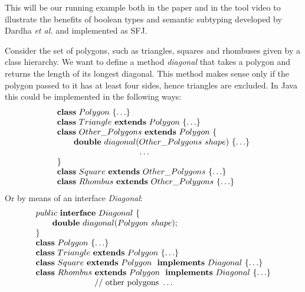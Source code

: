 \documentclass[runningheads]{llncs}
\begin{document}
\begin{example}[Polygons]
    \label{polygons}
    This will be our running example both in the paper and in the tool video \cite{UD20} to illustrate the benefits of boolean types and semantic subtyping developed by Dardha \emph{et al.} \cite{Dardha2013,Dardha2017} and implemented as SFJ.

    Consider the set of polygons, such as triangles, squares and rhombuses given by a class hierarchy.
    We want to define a method \emph{diagonal} that takes a polygon and returns the length of its longest diagonal.
    This method makes sense only if the polygon passed to it has at least four sides, hence triangles are excluded.
    In Java this could be implemented in the following ways:
    \begin{equation*}
        \begin{array}{l}
            \synclass Polygon \ \{ \ldots\}
            \\
            \syndecl{Triangle}{Polygon} {\ldots}
            \\
            \syndecl{Other\_Polygons}{Polygon} {
                \\
                \qquad \mathbf{double}\ diagonal(Other\_Polygons \ shape)\ \{\ldots \}
                \\
                \hspace{3.5cm} \ldots
                \\
            }
            \\
            \syndecl{Square}{Other\_Polygons}{\ldots}
            \\
            \syndecl{Rhombus}{Other\_Polygons} {\ldots}
        \end{array}
    \end{equation*}
    Or by means of an interface \emph{Diagonal}:
    \begin{equation*}
        \begin{array}{l}
            public \ \mathbf{interface} \  Diagonal\ \{
            \\
            \qquad \mathbf{double}\ diagonal(Polygon \ shape);
            \\
            \}
            \\
            \mathbf{class} \  Polygon \ \{\ldots\}
            \\
            \mathbf{class} \  Triangle \ \mathbf{extends }\  Polygon\ \{\ldots\}
            \\
            \mathbf{class} \  Square \ \mathbf{extends }\  Polygon\  \ \mathbf{implements}\  Diagonal \ \{\ldots\}
            \\
            \mathbf{class} \  Rhombus \ \mathbf{extends }\  Polygon\  \ \mathbf{implements}\  Diagonal \ \{\ldots\}
            \\
            \hspace{2.5cm} // \text{ other polygons } \ldots
        \end{array}
    \end{equation*}


\end{example}
\end{document}
